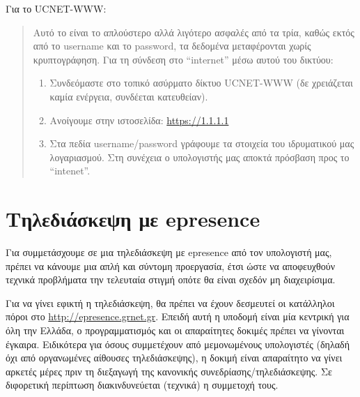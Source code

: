 \documentclass[a4paper,11pt,greek]{article}
\begin{document}
Για το UCNET-WWW:
\begin{quote}

Αυτό το είναι το απλούστερο αλλά λιγότερο ασφαλές από τα τρία, καθώς  εκτός από το username και το password, τα δεδομένα  μεταφέρονται χωρίς κρυπτογράφηση. Για τη σύνδεση στο ``internet'' μέσω αυτού του δικτύου:
\begin{enumerate}
\item {} 
Συνδεόμαστε στο τοπικό ασύρματο δίκτυο UCNET-WWW (δε χρειάζεται καμία ενέργεια, συνδέεται κατευθείαν).

\item {} 
Ανοίγουμε στην ιστοσελίδα: \url{https://1.1.1.1}

\item {} 
Στα πεδία username/password γράφουμε τα στοιχεία του ιδρυματικού μας λογαριασμού. Στη συνέχεια ο υπολογιστής μας αποκτά πρόσβαση προς το ``intenet''.

\end{enumerate}
\end{quote}


\section{Τηλεδιάσκεψη με epresence}
\label{HowToEpresence:epresence}\label{HowToEpresence::doc}
Για συμμετάσχουμε σε μια τηλεδιάσκεψη με epresence από τον υπολογιστή μας, πρέπει να κάνουμε μια απλή και σύντομη προεργασία, έτσι ώστε να αποφευχθούν τεχνικά προβλήματα την τελευταία στιγμή οπότε θα είναι σχεδόν μη διαχειρίσιμα.

Για να γίνει εφικτή η τηλεδιάσκεψη, θα πρέπει να έχουν δεσμευτεί οι κατάλληλοι πόροι στο \url{http://epresence.grnet.gr}. Επειδή αυτή η υποδομή είναι μία κεντρική για όλη την Ελλάδα, ο προγραμματισμός και οι απαραίτητες δοκιμές πρέπει να γίνονται έγκαιρα. Ειδικότερα για όσους συμμετέχουν από μεμονωμένους υπολογιστές (δηλαδή όχι από οργανωμένες αίθουσες τηλεδιάσκεψης), η δοκιμή είναι απαραίτητο να γίνει αρκετές μέρες πριν τη διεξαγωγή της κανονικής συνεδρίασης/τηλεδιάσκεψης. Σε διφορετική περίπτωση διακινδυνεύεται (τεχνικά) η συμμετοχή τους.
\end{document}
